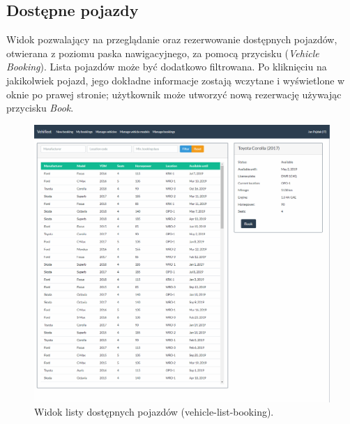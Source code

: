 \documentclass[eng,printmode,openany]{mgr}
\begin{document}
\begin{appendices}
		\section{Dostępne pojazdy}
		Widok pozwalający na przeglądanie oraz rezerwowanie dostępnych pojazdów, otwierana z poziomu paska nawigacyjnego, za pomocą przycisku (\textit{Vehicle Booking}). Lista pojazdów może być dodatkowo filtrowana. Po kliknięciu na jakikolwiek pojazd, jego dokładne informacje zostają wczytane i wyświetlone w oknie po prawej stronie; użytkownik może utworzyć nową rezerwację używając przycisku \textit{Book}. 
		\begin{figure}[H]
			\centering
			\includegraphics[width=\textwidth]{images/views/vehicle-booking-2.png}
			\caption{Widok listy dostępnych pojazdów (vehicle-list-booking).}
		\end{figure}
		
		\newpage

\end{appendices}
\end{document}
